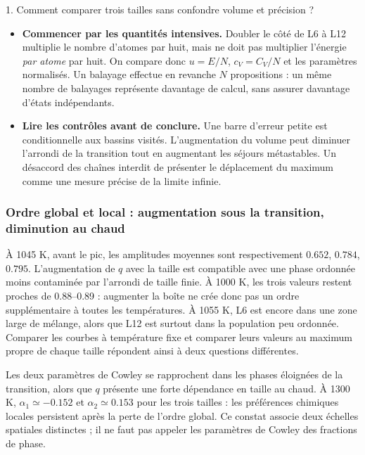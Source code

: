 \begin{oral}{1. Comment comparer trois tailles sans confondre volume et précision ?}

\begin{itemize}

\item \textbf{Commencer par les quantités intensives.} Doubler le côté de L6 à L12 multiplie le nombre d’atomes par huit, mais ne doit pas multiplier l’énergie \emph{par atome} par huit. On compare donc $u=E/N$, $c_V=C_V/N$ et les paramètres normalisés. Un balayage effectue en revanche $N$ propositions : un même nombre de balayages représente davantage de calcul, sans assurer davantage d’états indépendants.

\item \textbf{Lire les contrôles avant de conclure.} Une barre d’erreur petite est conditionnelle aux bassins visités. L’augmentation du volume peut diminuer l’arrondi de la transition tout en augmentant les séjours métastables. Un désaccord des chaînes interdit de présenter le déplacement du maximum comme une mesure précise de la limite infinie.

\end{itemize}\end{oral}

\subsubsection{Ordre global et local : augmentation sous la transition, diminution au chaud}


À 1045 K, avant le pic, les amplitudes moyennes sont respectivement $0.652$, $0.784$, $0.795$. L’augmentation de $q$ avec la taille est compatible avec une phase ordonnée moins contaminée par l’arrondi de taille finie. À 1000 K, les trois valeurs restent proches de 0.88--0.89 : augmenter la boîte ne crée donc pas un ordre supplémentaire à toutes les températures. À 1055 K, L6 est encore dans une zone large de mélange, alors que L12 est surtout dans la population peu ordonnée. Comparer les courbes à température fixe et comparer leurs valeurs au maximum propre de chaque taille répondent ainsi à deux questions différentes.

Les deux paramètres de Cowley se rapprochent dans les phases éloignées de la transition, alors que $q$ présente une forte dépendance en taille au chaud. À 1300 K, $\alpha_1\simeq-0.152$ et $\alpha_2\simeq0.153$ pour les trois tailles : les préférences chimiques locales persistent après la perte de l’ordre global. Ce constat associe deux échelles spatiales distinctes ; il ne faut pas appeler les paramètres de Cowley des fractions de phase.

